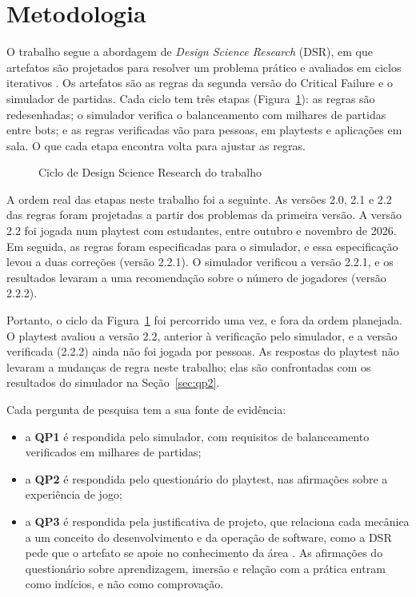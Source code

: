 \section{Metodologia}
\label{sec:metodologia}

O trabalho segue a abordagem de \emph{Design Science Research} (DSR), em que artefatos são projetados para
resolver um problema prático e avaliados em ciclos iterativos \cite{hevner2004,wieringa2014}. Os artefatos são as
regras da segunda versão do Critical Failure e o simulador de partidas. Cada ciclo tem três etapas
(Figura~\ref{fig:ciclo}): as regras são redesenhadas; o simulador verifica o balanceamento com milhares de
partidas entre bots; e as regras verificadas vão para pessoas, em playtests e aplicações em sala. O que cada
etapa encontra volta para ajustar as regras.

\begin{figure}[ht]
  \centering
  
  \caption{Ciclo de Design Science Research do trabalho}
  \label{fig:ciclo}
\end{figure}

A ordem real das etapas neste trabalho foi a seguinte. As versões 2.0, 2.1 e 2.2 das regras foram projetadas a
partir dos problemas da primeira versão. A versão 2.2 foi jogada num playtest com estudantes, entre outubro e
novembro de 2026. Em seguida, as regras foram especificadas para o simulador, e essa especificação levou a duas
correções (versão 2.2.1). O simulador verificou a versão 2.2.1, e os resultados levaram a uma recomendação sobre o
número de jogadores (versão 2.2.2).

Portanto, o ciclo da Figura~\ref{fig:ciclo} foi percorrido uma vez, e fora da ordem planejada. O
playtest avaliou a versão 2.2, anterior à verificação pelo simulador, e a versão verificada (2.2.2) ainda não foi
jogada por pessoas. As respostas do playtest não levaram a mudanças de regra neste trabalho; elas são
confrontadas com os resultados do simulador na Seção~\ref{sec:qp2}.

Cada pergunta de pesquisa tem a sua fonte de evidência:
\begin{itemize}
  \item a \textbf{QP1} é respondida pelo simulador, com requisitos de balanceamento verificados em milhares de
    partidas;
  \item a \textbf{QP2} é respondida pelo questionário do playtest, nas afirmações sobre a experiência de jogo;
  \item a \textbf{QP3} é respondida pela justificativa de projeto, que relaciona cada mecânica a um conceito do
    desenvolvimento e da operação de software, como a DSR pede que o artefato se apoie no conhecimento da área
    \cite{hevner2004}. As afirmações do questionário sobre aprendizagem, imersão e relação com a prática entram
    como indícios, e não como comprovação.
\end{itemize}

